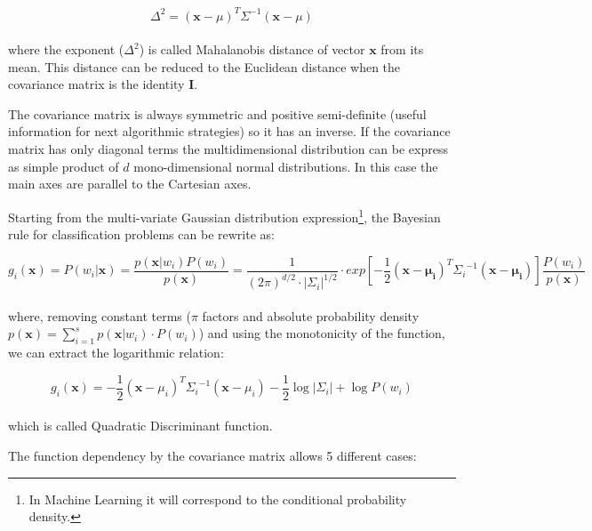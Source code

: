 \documentclass{standalone}
\begin{document}
$$
\Delta^2 = (\mathbf{x}-\mu)^T\Sigma^{-1}(\mathbf{x}-\mu)
$$
\\
where the exponent ($\Delta^2$) is called Mahalanobis distance of vector $\mathbf{x}$ from its mean.
This distance can be reduced to the Euclidean distance when the covariance matrix is the identity $\mathbf{I}$.

The covariance matrix is always symmetric and positive semi-definite (useful information for next algorithmic strategies) so it has an inverse.
If the covariance matrix has only diagonal terms the multidimensional distribution can be express as simple product of $d$ mono-dimensional normal distributions.
In this case the main axes are parallel to the Cartesian axes.

Starting from the multi-variate Gaussian distribution expression\footnote{
  In Machine Learning it will correspond to the conditional probability density.
}, the Bayesian rule for classification problems can be rewrite as:

$$
g_i(\mathbf{x}) = P(w_i|\mathbf{x}) = \frac{p(\mathbf{x}|w_i)P(w_i)}{p(\mathbf{x})} = \frac{1}{(2\pi)^{d/2}\cdot\left|\Sigma_i\right|^{1/2}}\cdot exp\left[-\frac{1}{2}(\mathbf{x}-\mathbf{\mu_i})^T{\Sigma_i}^{-1}(\mathbf{x}-\mathbf{\mu_i})\right] \frac{P(w_i)}{p(\mathbf{x})}
$$
\\
where, removing constant terms ($\pi$ factors and absolute probability density $p(\mathbf{x}) = \sum_{i=1}^s p(\mathbf{x}|w_i)\cdot P(w_i)$) and using the monotonicity of the function, we can extract the logarithmic relation:

$$
g_i(\mathbf{x}) = -\frac{1}{2}(\mathbf{x}-\mu_i)^T{\Sigma_i}^{-1}(\mathbf{x}-\mu_i) -\frac{1}{2}\log\left|\Sigma_i\right|+\log P(w_i)
$$
\\
which is called Quadratic Discriminant function.

The function dependency by the covariance matrix allows 5 different cases:
\end{document}
